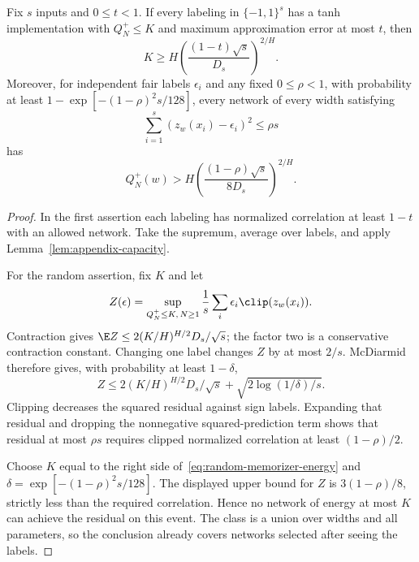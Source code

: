 \begin{theorem}
\label{thm:memorizer-optimality}
Fix $s$ inputs and $0\le t<1$. If every labeling in $\{-1,1\}^s$ has a tanh implementation with $Q_N^+\le K$ and maximum approximation error at most $t$, then
\[
 K\ge H\left(\frac{(1-t)\sqrt s}{D_s}\right)^{2/H}.
\]
Moreover, for independent fair labels $\epsilon_i$ and any fixed $0\le\rho<1$, with probability at least $1-\exp[-(1-\rho)^2s/128]$, every network of every width satisfying
\[
 \sum_{i=1}^s(z_w(x_i)-\epsilon_i)^2\le\rho s
\]
has
\begin{equation}
 Q_N^+(w)>H\left(\frac{(1-\rho)\sqrt s}{8D_s}\right)^{2/H}.
 \label{eq:random-memorizer-energy}
\end{equation}
\end{theorem}
\begin{proof}
In the first assertion each labeling has normalized correlation at least $1-t$ with an allowed network. Take the supremum, average over labels, and apply Lemma~\ref{lem:appendix-capacity}.

For the random assertion, fix $K$ and let
\[
 Z(\epsilon)=\sup_{Q_N^+\le K,\,N\ge1}
       \frac1s\sum_i\epsilon_i\clip(z_w(x_i)).
\]
Contraction gives $\E Z\le2(K/H)^{H/2}D_s/\sqrt s$; the factor two is a conservative contraction constant. Changing one label changes $Z$ by at most $2/s$. McDiarmid therefore gives, with probability at least $1-\delta$,
\[
 Z\le2(K/H)^{H/2}D_s/\sqrt s+
                      \sqrt{2\log(1/\delta)/s}.
\]
Clipping decreases the squared residual against sign labels. Expanding that residual and dropping the nonnegative squared-prediction term shows that residual at most $\rho s$ requires clipped normalized correlation at least $(1-\rho)/2$.

Choose $K$ equal to the right side of~\eqref{eq:random-memorizer-energy} and $\delta=\exp[-(1-\rho)^2s/128]$. The displayed upper bound for $Z$ is $3(1-\rho)/8$, strictly less than the required correlation. Hence no network of energy at most $K$ can achieve the residual on this event. The class is a union over widths and all parameters, so the conclusion already covers networks selected after seeing the labels.
\end{proof}


